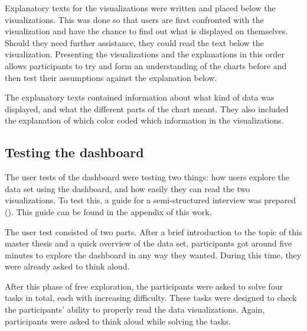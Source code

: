 Explanatory texts for the visualizations were written and placed below the visualizations. This was done so that users are first confronted with the visualization and have the chance to find out what is displayed on themselves. Should they need further assistance, they could read the text below the visualization. Presenting the visualizations and the explanations in this order allows participants to try and form an understanding of the charts before and then test their assumptions against the explanation below.

The explanatory texts contained information about what kind of data was displayed, and what the different parts of the chart meant. They also included the explanation of which color coded which information in the visualizations.

\subsection{Testing the dashboard}
The user tests of the dashboard were testing two things: how users explore the data set using the dashboard, and how easily they can read the two visualizations. To test this, a guide for a semi-structured interview was prepared (\cite[315ff.]{schnell1999methoden}). This guide can be found in the appendix of this work.

The user test consisted of two parts. After a brief introduction to the topic of this master thesis and a quick overview of the data set, participants got around five minutes to explore the dashboard in any way they wanted. During this time, they were already asked to think aloud.

After this phase of free exploration, the participants were asked to solve four tasks in total, each with increasing difficulty. These tasks were designed to check the participants' ability to properly read the data visualizations. Again, participants were asked to think aloud while solving the tasks.

